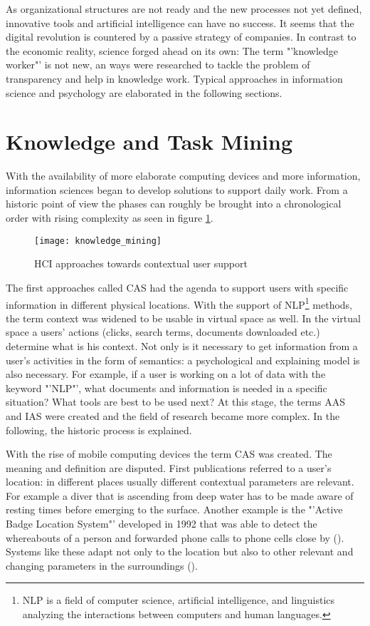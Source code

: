 As organizational structures are not ready and the new processes not yet defined, innovative tools and artificial intelligence can have no success. It seems that the digital revolution is countered by a passive strategy of companies. In contrast to the economic reality, science forged ahead on its own: The term "'knowledge worker"' is not new, an ways were researched to tackle the problem of transparency and help in knowledge work. Typical approaches in information science and psychology are elaborated in the following sections.

\section{Knowledge and Task Mining}
\label{knowledgeandtask}
With the availability of more elaborate computing devices and more information, information sciences began to develop solutions to support daily work. From a historic point of view the phases can roughly be brought into a chronological order with rising complexity as seen in figure \ref{fig2}. 

\begin{figure}[ht]
	\centering
  \texttt{[image: knowledge\_mining]}
	\caption{HCI approaches towards contextual user support}
	\label{fig2}
\end{figure}

The first approaches called \ac{CAS} had the agenda to support users with specific information in different physical locations. With the support of \ac{NLP}\footnote{NLP is a field of computer science, artificial intelligence, and linguistics analyzing the interactions between computers and human languages.} methods, the term context was widened to be usable in virtual space as well. In the virtual space a users' actions (clicks, search terms, documents downloaded etc.) determine what is his context. Not only is it necessary to get information from a user's activities in the form of semantics: a psychological and explaining model is also necessary. For example, if a user is working on a lot of data with the keyword "'NLP"', what documents and information is needed in a specific situation? What tools are best to be used next? At this stage, the terms \ac{AAS} and \ac{IAS} were created and the field of research became more complex. In the following, the historic process is explained.

 With the rise of mobile computing devices the term \ac{CAS} was created. The meaning and definition are disputed. First publications referred to a user's location: in different places usually different contextual parameters are relevant. For example a diver that is ascending from deep water has to be made aware of resting times before emerging to the surface. Another example is the "'Active Badge Location System"' developed in 1992 that was able to detect the whereabouts of a person and forwarded phone calls to phone cells close by (\cite{want1992active}). Systems like these adapt not only to the location but also to other relevant and changing parameters in the surroundings (\cite{schilit1994context}). 

